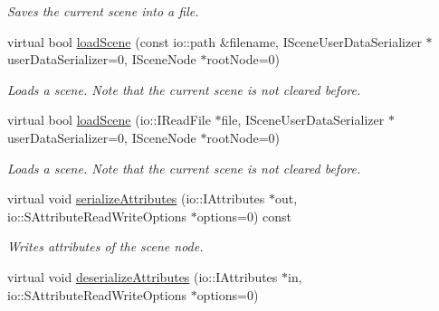 \begin{DoxyCompactItemize}
\begin{DoxyCompactList}\small\item\em Saves the current scene into a file. \end{DoxyCompactList}\item 
virtual bool \hyperlink{classirr_1_1scene_1_1_c_scene_manager_a03b1765239c02e9b934624a8ec30214c}{load\-Scene} (const io\-::path \&filename, I\-Scene\-User\-Data\-Serializer $\ast$user\-Data\-Serializer=0, I\-Scene\-Node $\ast$root\-Node=0)
\begin{DoxyCompactList}\small\item\em Loads a scene. Note that the current scene is not cleared before. \end{DoxyCompactList}\item 
\hypertarget{classirr_1_1scene_1_1_c_scene_manager_a9dbff7698c6d920e0d9c888e3aa0e787}{virtual bool \hyperlink{classirr_1_1scene_1_1_c_scene_manager_a9dbff7698c6d920e0d9c888e3aa0e787}{load\-Scene} (io\-::\-I\-Read\-File $\ast$file, I\-Scene\-User\-Data\-Serializer $\ast$user\-Data\-Serializer=0, I\-Scene\-Node $\ast$root\-Node=0)}\label{classirr_1_1scene_1_1_c_scene_manager_a9dbff7698c6d920e0d9c888e3aa0e787}

\begin{DoxyCompactList}\small\item\em Loads a scene. Note that the current scene is not cleared before. \end{DoxyCompactList}\item 
\hypertarget{classirr_1_1scene_1_1_c_scene_manager_a7b883946d2db644b90ecf83d06918332}{virtual void \hyperlink{classirr_1_1scene_1_1_c_scene_manager_a7b883946d2db644b90ecf83d06918332}{serialize\-Attributes} (io\-::\-I\-Attributes $\ast$out, io\-::\-S\-Attribute\-Read\-Write\-Options $\ast$options=0) const }\label{classirr_1_1scene_1_1_c_scene_manager_a7b883946d2db644b90ecf83d06918332}

\begin{DoxyCompactList}\small\item\em Writes attributes of the scene node. \end{DoxyCompactList}\item 
\hypertarget{classirr_1_1scene_1_1_c_scene_manager_a7bdf857f083eea1bc5bea9f0504e18c9}{virtual void \hyperlink{classirr_1_1scene_1_1_c_scene_manager_a7bdf857f083eea1bc5bea9f0504e18c9}{deserialize\-Attributes} (io\-::\-I\-Attributes $\ast$in, io\-::\-S\-Attribute\-Read\-Write\-Options $\ast$options=0)}\label{classirr_1_1scene_1_1_c_scene_manager_a7bdf857f083eea1bc5bea9f0504e18c9}


\end{DoxyCompactItemize}
